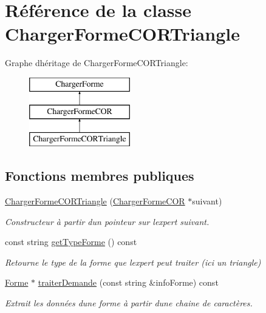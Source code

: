 \hypertarget{class_charger_forme_c_o_r_triangle}{}\section{Référence de la classe Charger\+Forme\+C\+O\+R\+Triangle}
\label{class_charger_forme_c_o_r_triangle}
Graphe d\textquotesingle{}héritage de Charger\+Forme\+C\+O\+R\+Triangle\+:\begin{figure}[H]
\begin{center}
\leavevmode
\includegraphics[height=3.000000cm]{class_charger_forme_c_o_r_triangle}
\end{center}
\end{figure}
\subsection*{Fonctions membres publiques}
\begin{DoxyCompactItemize}
\item 
\mbox{\hyperlink{class_charger_forme_c_o_r_triangle_ab0e825f083ba91bd938d982b5217ca8e}{Charger\+Forme\+C\+O\+R\+Triangle}} (\mbox{\hyperlink{class_charger_forme_c_o_r}{Charger\+Forme\+C\+OR}} $\ast$suivant)
\begin{DoxyCompactList}\small\item\em Constructeur à partir d\textquotesingle{}un pointeur sur l\textquotesingle{}expert suivant. \end{DoxyCompactList}\item 
const string \mbox{\hyperlink{class_charger_forme_c_o_r_triangle_a7a0271b76c6abea8c67be2c920d72925}{get\+Type\+Forme}} () const
\begin{DoxyCompactList}\small\item\em Retourne le type de la forme que l\textquotesingle{}expert peut traiter (ici un triangle) \end{DoxyCompactList}\item 
\mbox{\hyperlink{class_forme}{Forme}} $\ast$ \mbox{\hyperlink{class_charger_forme_c_o_r_triangle_aaa2b1605bb747f29a559f966754237a2}{traiter\+Demande}} (const string \&info\+Forme) const
\begin{DoxyCompactList}\small\item\em Extrait les données d\textquotesingle{}une forme à partir d\textquotesingle{}une chaine de caractères. \end{DoxyCompactList}\end{DoxyCompactItemize}
